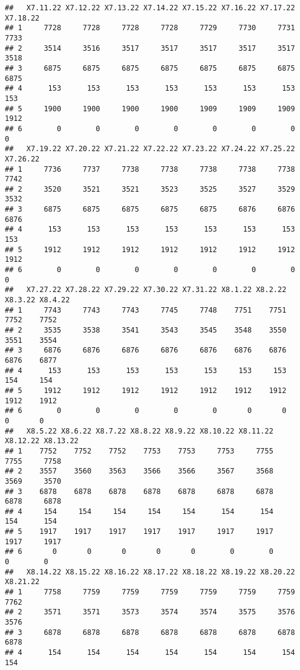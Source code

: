 \documentclass[
]{article}
\begin{document}
\begin{verbatim}
##   X7.11.22 X7.12.22 X7.13.22 X7.14.22 X7.15.22 X7.16.22 X7.17.22 X7.18.22
## 1     7728     7728     7728     7728     7729     7730     7731     7733
## 2     3514     3516     3517     3517     3517     3517     3517     3518
## 3     6875     6875     6875     6875     6875     6875     6875     6875
## 4      153      153      153      153      153      153      153      153
## 5     1900     1900     1900     1900     1909     1909     1909     1912
## 6        0        0        0        0        0        0        0        0
##   X7.19.22 X7.20.22 X7.21.22 X7.22.22 X7.23.22 X7.24.22 X7.25.22 X7.26.22
## 1     7736     7737     7738     7738     7738     7738     7738     7742
## 2     3520     3521     3521     3523     3525     3527     3529     3532
## 3     6875     6875     6875     6875     6875     6876     6876     6876
## 4      153      153      153      153      153      153      153      153
## 5     1912     1912     1912     1912     1912     1912     1912     1912
## 6        0        0        0        0        0        0        0        0
##   X7.27.22 X7.28.22 X7.29.22 X7.30.22 X7.31.22 X8.1.22 X8.2.22 X8.3.22 X8.4.22
## 1     7743     7743     7743     7745     7748    7751    7751    7752    7752
## 2     3535     3538     3541     3543     3545    3548    3550    3551    3554
## 3     6876     6876     6876     6876     6876    6876    6876    6876    6877
## 4      153      153      153      153      153     153     153     154     154
## 5     1912     1912     1912     1912     1912    1912    1912    1912    1912
## 6        0        0        0        0        0       0       0       0       0
##   X8.5.22 X8.6.22 X8.7.22 X8.8.22 X8.9.22 X8.10.22 X8.11.22 X8.12.22 X8.13.22
## 1    7752    7752    7752    7753    7753     7753     7755     7755     7758
## 2    3557    3560    3563    3566    3566     3567     3568     3569     3570
## 3    6878    6878    6878    6878    6878     6878     6878     6878     6878
## 4     154     154     154     154     154      154      154      154      154
## 5    1917    1917    1917    1917    1917     1917     1917     1917     1917
## 6       0       0       0       0       0        0        0        0        0
##   X8.14.22 X8.15.22 X8.16.22 X8.17.22 X8.18.22 X8.19.22 X8.20.22 X8.21.22
## 1     7758     7759     7759     7759     7759     7759     7759     7762
## 2     3571     3571     3573     3574     3574     3575     3576     3576
## 3     6878     6878     6878     6878     6878     6878     6878     6878
## 4      154      154      154      154      154      154      154      154

\end{verbatim}
\end{document}
